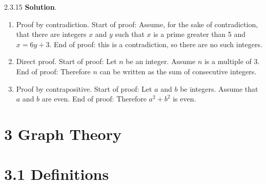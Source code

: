 \documentclass[11pt,]{book}
\theoremstyle{ptxplainnotitle}
\theoremstyle{ptxplaintitle}
\theoremstyle{ptxdefinitionnotitle}
\theoremstyle{ptxdefinitiontitle}
\theoremstyle{ptxdefinitionnotitle}
\theoremstyle{ptxdefinitiontitle}
\theoremstyle{ptxdefinitionnotitle}
\theoremstyle{ptxdefinitiontitle}
\theoremstyle{ptxdefinitiontitlenonumber}
\theoremstyle{ptxdefinitiontitlenonumber}
\numberwithin{equation}{chapter}
\begin{document}
\begin{divisionexercise}{2.3.15}
\textbf{Solution}.\quad%
\hypertarget{p-2676}{}%
\leavevmode%
\begin{enumerate}[label=(\alph*)]
\item\hypertarget{li-1327}{}\hypertarget{p-2677}{}%
Proof by contradiction. Start of proof: Assume, for the sake of contradiction, that there are integers \(x\) and \(y\) such that \(x\) is a prime greater than 5 and \(x = 6y + 3\). End of proof: \textellipsis{} this is a contradiction, so there are no such integers.%
\item\hypertarget{li-1328}{}\hypertarget{p-2678}{}%
Direct proof. Start of proof: Let \(n\) be an integer. Assume \(n\) is a multiple of 3. End of proof: Therefore \(n\) can be written as the sum of consecutive integers.%
\item\hypertarget{li-1329}{}\hypertarget{p-2679}{}%
Proof by contrapositive. Start of proof: Let \(a\) and \(b\) be integers. Assume that \(a\) and \(b\) are even. End of proof: Therefore \(a^2 + b^2\) is even.%
\end{enumerate}
%
\end{divisionexercise}%
\section*{3 Graph Theory}
\section*{3.1 Definitions}
\end{document}
